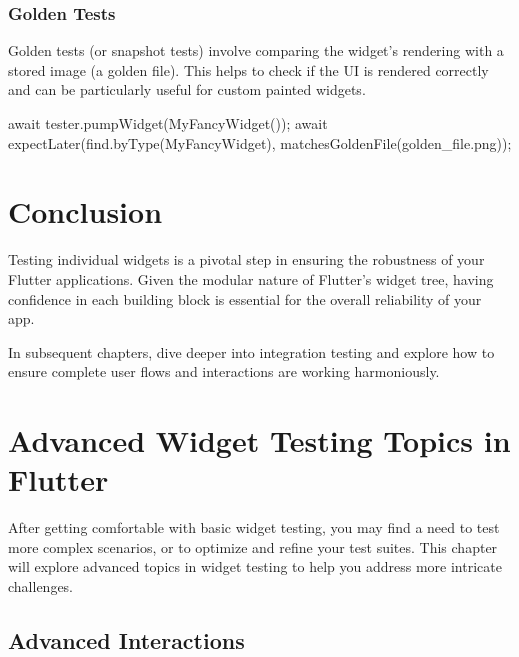 \documentclass[
]{article}
\newenvironment{Shaded}{\begin{snugshade}}{\end{snugshade}}
\newcommand{\AttributeTok}[1]{\textcolor[rgb]{0.16,0.50,0.73}{#1}}
\newcommand{\NormalTok}[1]{\textcolor[rgb]{0.81,0.81,0.76}{#1}}
\newcommand{\OperatorTok}[1]{\textcolor[rgb]{0.81,0.81,0.76}{#1}}
\newcommand{\StringTok}[1]{\textcolor[rgb]{0.96,0.31,0.31}{#1}}
\begin{document}
\subsubsection{Golden Tests}\label{golden-tests}

Golden tests (or snapshot tests) involve comparing the widget's
rendering with a stored image (a golden file). This helps to check if
the UI is rendered correctly and can be particularly useful for custom
painted widgets.

\begin{Shaded}
\begin{Highlighting}[]
\AttributeTok{await}\NormalTok{ tester}\OperatorTok{.}\NormalTok{pumpWidget(MyFancyWidget());}
\AttributeTok{await}\NormalTok{ expectLater(find}\OperatorTok{.}\NormalTok{byType(MyFancyWidget)}\OperatorTok{,}\NormalTok{ matchesGoldenFile(}\StringTok{\textquotesingle{}golden\_file.png\textquotesingle{}}\NormalTok{));}
\end{Highlighting}
\end{Shaded}

\section{Conclusion}\label{conclusion-6}

Testing individual widgets is a pivotal step in ensuring the robustness
of your Flutter applications. Given the modular nature of Flutter's
widget tree, having confidence in each building block is essential for
the overall reliability of your app.

In subsequent chapters, dive deeper into integration testing and explore
how to ensure complete user flows and interactions are working
harmoniously.

\section{Advanced Widget Testing Topics in
Flutter}\label{advanced-widget-testing-topics-in-flutter}

After getting comfortable with basic widget testing, you may find a need
to test more complex scenarios, or to optimize and refine your test
suites. This chapter will explore advanced topics in widget testing to
help you address more intricate challenges.

\subsection{Advanced Interactions}\label{advanced-interactions}
\end{document}
